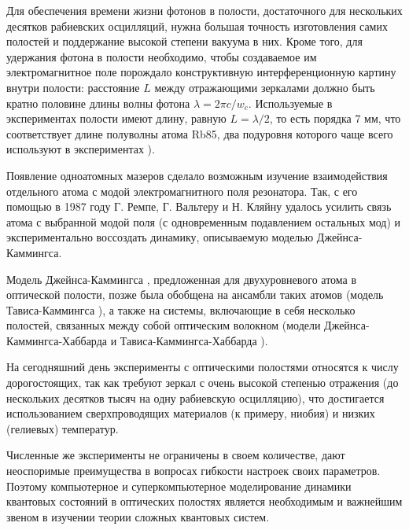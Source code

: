 Для обеспечения времени жизни фотонов в полости, достаточного для нескольких десятков рабиевских осцилляций, нужна большая точность изготовления самих полостей и поддержание высокой степени вакуума в них. Кроме того, для удержания фотона в полости необходимо, чтобы создаваемое им электромагнитное поле порождало конструктивную интерференционную картину внутри полости: расстояние $L$ между отражающими зеркалами должно быть кратно половине длины волны фотона $\lambda = 2\pi c/w_{c}$. Используемые в экспериментах полости имеют длину, равную $L = \lambda/2$, то есть порядка 7 мм, что соответствует длине полуволны атома Rb85, два подуровня которого чаще всего используют в экспериментах \cite{rempe,rb_1,rb_2,rb_3}).

Появление одноатомных мазеров сделало возможным изучение взаимодействия отдельного атома с модой электромагнитного поля резонатора. Так, с его помощью в 1987 году Г. Ремпе, Г. Вальтеру и Н. Кляйну \cite{rempe} удалось усилить связь атома с выбранной модой поля (с одновременным подавлением остальных мод) и экспериментально воссоздать динамику, описываемую моделью Джейнса-Каммингса.

Модель Джейнса-Каммингса \cite{jc_comparison,jc_qudit,jc_ladder,jc_descendants,jc_phase_transition}, предложенная для двухуровневого атома в оптической полости, позже была обобщена на ансамбли таких атомов (модель Тависа-Каммингса \cite{tc_exact_solution,tc_a_study,tc_dicke_2,tc_improvement,tc_experimental}), а также на системы, включающие в себя несколько полостей, связанных между собой оптическим волокном (модели Джейнса-Каммингса-Хаббарда \cite{jch_time_evolution,jch_site_dependent_control,jch_quench_dynamics} и Тависа-Каммингса-Хаббарда \cite{tch_photon_blockade,tch_transfer,tch_quality}).

На сегодняшний день эксперименты с оптическими полостями \cite{cavity_exp_1,cavity_exp_2,cavity_exp_3} относятся к числу дорогостоящих, так как требуют зеркал с очень высокой степенью отражения (до нескольких десятков тысяч на одну рабиевскую осцилляцию), что достигается использованием сверхпроводящих материалов (к примеру, ниобия) и низких (гелиевых) температур.

Численные же эксперименты не ограничены в своем количестве, дают неоспоримые преимущества в вопросах гибкости настроек своих параметров. Поэтому компьютерное и суперкомпьютерное моделирование динамики квантовых состояний в оптических полостях является необходимым и важнейшим звеном в изучении теории сложных квантовых систем.

